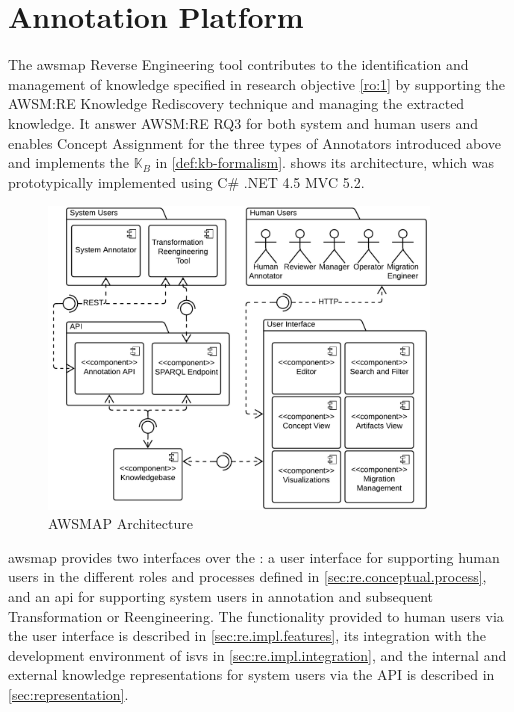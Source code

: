 \vspace{-15pt}
\hypertarget{sec:extraction.platform}{%
\section{Annotation Platform}\label{sec:extraction.platform}}
\vspace{15pt}

The \gls{awsmap} \autocite{Heil2016AWSM} \gls{Reverse Engineering} tool contributes to the identification and management of knowledge specified in research objective \cref{ro:1} by supporting the AWSM:RE Knowledge Rediscovery technique and managing the extracted knowledge.
It answer AWSM:RE RQ3 for both system and human users and enables \gls{Concept Assignment} for the three types of Annotators introduced above and implements the \awsmknowledgebase \(\mathbb{K}_{B}\) in \cref{def:kb-formalism}.
 shows its architecture, which was prototypically implemented using C\# .NET 4.5 MVC 5.2.
\begin{figure}[h!]
\hypertarget{fig:awsmap}{%
\centering
\includegraphics[width=0.9\textwidth]{../figures/awsmap-NOFONTS.pdf}
\caption{AWSMAP Architecture}\label{fig:awsmap}
}
\end{figure}

\gls{awsmap} provides two interfaces over the \awsmknowledgebase: a user interface for supporting human users in the different roles and processes defined in \cref{sec:re.conceptual.process}, and an \gls{api} for supporting system users in annotation and subsequent \gls{Transformation} or \gls{Reengineering}.
The functionality provided to human users via the user interface is described in \cref{sec:re.impl.features}, its integration with the development environment of \glspl{isv} in \cref{sec:re.impl.integration}, and the internal and external knowledge representations for system users via the API is described in \cref{sec:representation}.

